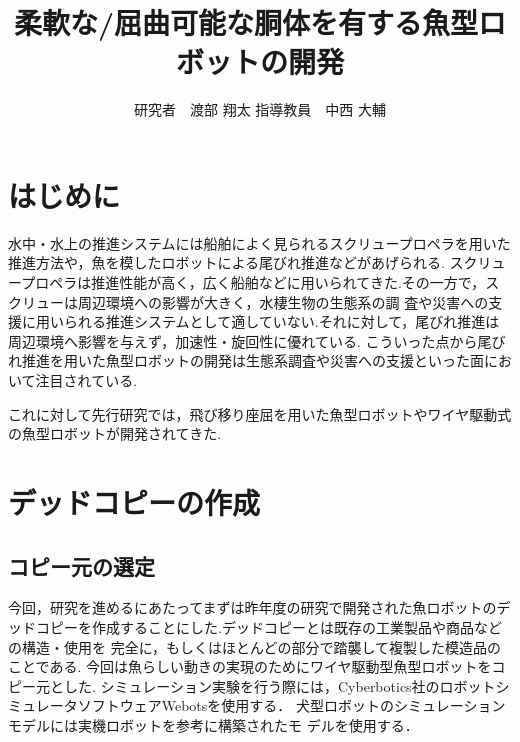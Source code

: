 \documentclass{jarticle}
\begin{document}

\title{
柔軟な/屈曲可能な胴体を有する魚型ロボットの開発
}
\author{
研究者　渡部 翔太\;\;\;
指導教員　中西 大輔
}

\maketitle

\thispagestyle{empty}  %

\section{はじめに}

水中・水上の推進システムには船舶によく見られるスクリュープロペラを用いた推進方法や，魚を模したロボットによる尾びれ推進などがあげられる.
スクリュープロペラは推進性能が高く，広く船舶などに用いられてきた.その一方で，スクリューは周辺環境への影響が大きく，水棲生物の生態系の調
査や災害への支援に用いられる推進システムとして適していない.それに対して，尾びれ推進は周辺環境へ影響を与えず，加速性・旋回性に優れている.
こういった点から尾びれ推進を用いた魚型ロボットの開発は生態系調査や災害への支援といった面において注目されている.

これに対して先行研究では，飛び移り座屈を用いた魚型ロボットやワイヤ駆動式の魚型ロボットが開発されてきた.

\vspace*{-2mm}
\section{デッドコピーの作成}
\subsection{コピー元の選定}
今回，研究を進めるにあたってまずは昨年度の研究で開発された魚ロボットのデッドコピーを作成することにした.デッドコピーとは既存の工業製品や商品などの構造・使用を
完全に，もしくはほとんどの部分で踏襲して複製した模造品のことである.
今回は魚らしい動きの実現のためにワイヤ駆動型魚型ロボットをコピー元とした.
シミュレーション実験を行う際には，Cyberbotics社のロボットシミュレータソフトウェアWebotsを使用する．
犬型ロボットのシミュレーションモデルには実機ロボットを参考に構築されたモ
デルを使用する．
\end{document}
